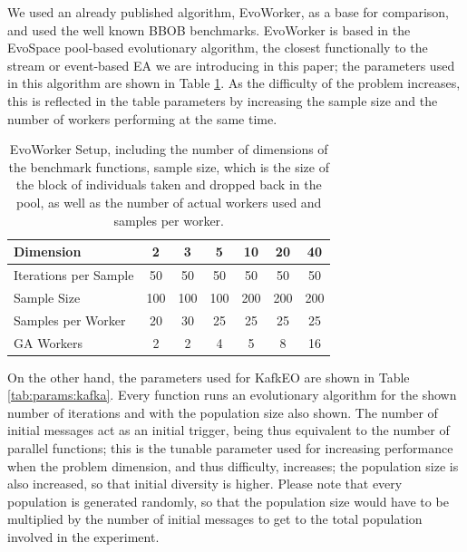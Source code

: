 \documentclass[sigconf]{acmart}
\begin{document}
We used an already published algorithm, EvoWorker, as a base for
comparison, and used the well known BBOB benchmarks. EvoWorker is
based in the EvoSpace \cite{DBLP:conf/evoW/ValdezTVGO13} pool-based
evolutionary algorithm, the closest functionally to the stream or
event-based EA we are introducing in this paper; the parameters used
in this algorithm are shown in Table \ref{tab:params:evoworkers}. As
the difficulty of the problem increases, this is reflected in the
table parameters by increasing the sample size and the number of
workers performing at the same time. 
\begin{table}
  \small
  \caption{EvoWorker Setup, including the number of dimensions of the
    benchmark functions, sample size, which is the size of the block
    of individuals taken and dropped back in the pool, as well as the
    number of actual workers used and samples per worker. }
  \label{tab:params:evoworkers} 
  \centering
  \small
  \begin{tabular}{|l|c|c|c|c|c|c|}
    \hline
    Dimension & 2 & 3 & 5 & 10 & 20 & 40\\ \hline
    Iterations per Sample  & 50 & 50 & 50 & 50 & 50 & 50\\ \hline
    Sample Size  & 100 & 100 & 100 & 200 & 200 & 200 \\ \hline
    Samples per Worker & 20 & 30 & 25 & 25 & 25 & 25  \\ \hline
    GA Workers & 2 & 2 & 4 & 5 & 8 & 16  \\ \hline
  \end{tabular}
\end{table}

On the other hand, the parameters used for KafkEO are shown in Table
\ref{tab:params:kafka}. Every function runs an evolutionary algorithm
for the shown number of iterations and with the population size also
shown. The number of initial messages act as an initial trigger, being
thus equivalent to the number of parallel functions; this is the
tunable parameter used for increasing performance when the problem
dimension, and thus difficulty, increases; the population size is also
increased, so that initial diversity is higher. Please note that every
population is generated randomly, so that the population size would
have to be multiplied by the number of initial messages to get to the
total population involved in the experiment. 
\end{document}
